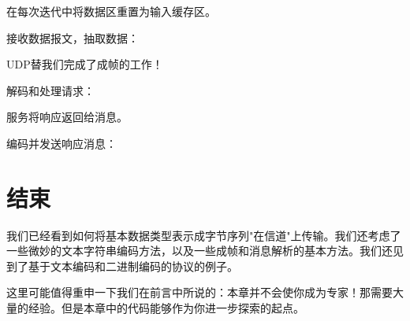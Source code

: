 		在每次迭代中将数据区重置为输入缓存区。 

		接收数据报文，抽取数据：

		UDP替我们完成了成帧的工作！ 

		解码和处理请求：

		服务将响应返回给消息。 

		编码并发送响应消息：

\section{结束} 

	我们已经看到如何将基本数据类型表示成字节序列"在信道"上传输。我们还考虑了一些微妙的文本字符串编码方法，以及一些成帧和消息解析的基本方法。我们还见到了基于文本编码和二进制编码的协议的例子。 

	这里可能值得重申一下我们在前言中所说的：本章并不会使你成为专家！那需要大量的经验。但是本章中的代码能够作为你进一步探索的起点。 

